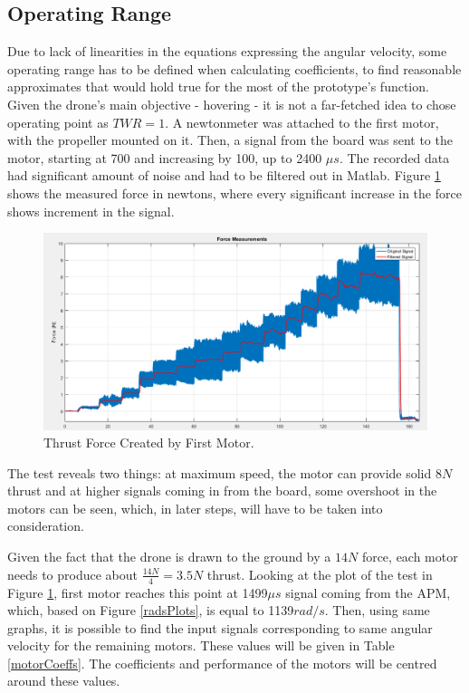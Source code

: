 \subsection{Operating Range}
Due to lack of linearities in the equations expressing the angular velocity, some operating range has to be defined when calculating coefficients, to find reasonable approximates that would hold true for the most of the prototype's function. Given the drone's main objective - hovering - it is not a far-fetched idea to chose operating point as $TWR = 1$. A newtonmeter was attached to the first motor, with the propeller mounted on it. Then, a signal from the board was sent to the motor, starting at 700 and increasing by 100, up to 2400 $\mu s$. The recorded data had significant amount of noise and had to be filtered out in Matlab. Figure \ref{forcePlot} shows the measured force in newtons, where every significant increase in the force shows increment in the signal.
\begin{figure}[H]
  \centering
    \includegraphics[width=1\textwidth]{images/forceMeasurements.png}
	\caption{Thrust Force Created by First Motor.}
	\label{forcePlot}
\end{figure}
The test reveals two things: at maximum speed, the motor can provide solid $8N$ thrust and at higher signals coming in from the board, some overshoot in the motors can be seen, which, in later steps, will have to be taken into consideration.

Given the fact that the drone is drawn to the ground by a $14N$ force, each motor needs to produce about $\frac{14N}{4} = 3.5N$ thrust. Looking at the plot of the test in Figure \ref{forcePlot}, first motor reaches this point at 1499$\mu s$ signal coming from the APM, which, based on Figure \ref{radsPlots}, is equal to 1139$rad/s$. Then, using same graphs, it is possible to find the input signals corresponding to same angular velocity for the remaining motors. These values will be given in Table \ref{motorCoeffs}.
The coefficients and performance of the motors will be centred around these values.

